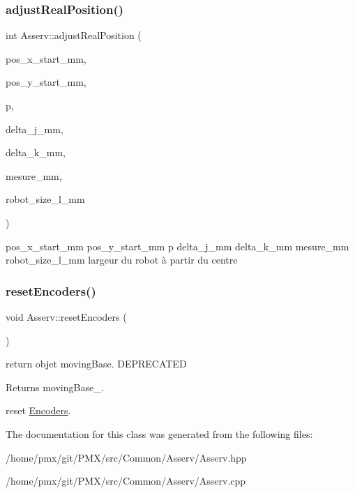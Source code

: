 \subsubsection{\texorpdfstring{adjust\+Real\+Position()}{adjustRealPosition()}}
{\footnotesize\ttfamily int Asserv\+::adjust\+Real\+Position (\begin{DoxyParamCaption}\item[{float}]{pos\+\_\+x\+\_\+start\+\_\+mm,  }\item[{float}]{pos\+\_\+y\+\_\+start\+\_\+mm,  }\item[{\hyperlink{structRobotPosition}{Robot\+Position}}]{p,  }\item[{float}]{delta\+\_\+j\+\_\+mm,  }\item[{float}]{delta\+\_\+k\+\_\+mm,  }\item[{float}]{mesure\+\_\+mm,  }\item[{float}]{robot\+\_\+size\+\_\+l\+\_\+mm }\end{DoxyParamCaption})}

pos\+\_\+x\+\_\+start\+\_\+mm pos\+\_\+y\+\_\+start\+\_\+mm p delta\+\_\+j\+\_\+mm delta\+\_\+k\+\_\+mm mesure\+\_\+mm robot\+\_\+size\+\_\+l\+\_\+mm largeur du robot à partir du centre \mbox{\label{classAsserv_a888d98868d09718b55e15daecd8c6849}} 
\subsubsection{\texorpdfstring{reset\+Encoders()}{resetEncoders()}}
{\footnotesize\ttfamily void Asserv\+::reset\+Encoders (\begin{DoxyParamCaption}{ }\end{DoxyParamCaption})}



return objet moving\+Base. D\+E\+P\+R\+E\+C\+A\+T\+ED 

\begin{DoxyReturn}{Returns}
moving\+Base\+\_\+.
\end{DoxyReturn}
reset \hyperlink{classEncoders}{Encoders}. 

The documentation for this class was generated from the following files\+:\begin{DoxyCompactItemize}
\item 
/home/pmx/git/\+P\+M\+X/src/\+Common/\+Asserv/Asserv.\+hpp\item 
/home/pmx/git/\+P\+M\+X/src/\+Common/\+Asserv/Asserv.\+cpp\end{DoxyCompactItemize}
